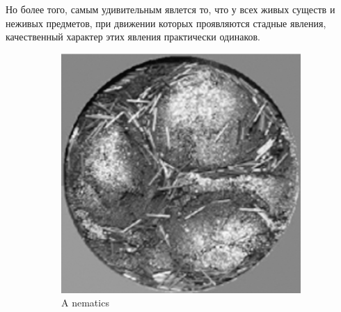 	Но более того, самым удивительным явлется то, что у всех живых существ и неживых предметов, при движении которых проявляются стадные явления, качественный характер этих явления практически одинаков. %
	\begin{figure}
        \centering
        \begin{subfigure}{.4\columnwidth}
                \includegraphics[width=\columnwidth]{Fig4_CollectiveMotion}
                \caption{A nematics}
                \label{fig:CollMot:nematics}
        \end{subfigure}%
        ~ %
        \begin{subfigure}{.4\columnwidth}

\end{subfigure}
\end{figure}
